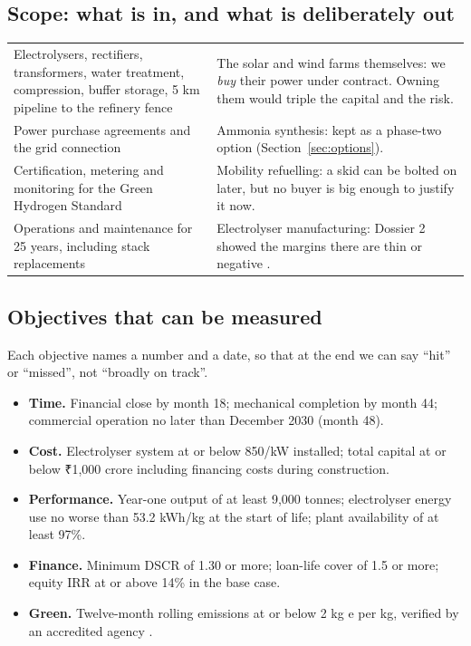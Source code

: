 \subsection{Scope: what is in, and what is deliberately out}
\begin{center}\tablefont
\begin{tabularx}{\textwidth}{@{}L L@{}}
\toprule
{} & \\ \midrule
Electrolysers, rectifiers, transformers, water treatment, compression, buffer storage, 5 km pipeline to the refinery fence & The solar and wind farms themselves: we \emph{buy} their power under contract. Owning them would triple the capital and the risk.\\
Power purchase agreements and the grid connection & Ammonia synthesis: kept as a phase-two option (Section~\ref{sec:options}).\\
Certification, metering and monitoring for the Green Hydrogen Standard & Mobility refuelling: a skid can be bolted on later, but no buyer is big enough to justify it now.\\
Operations and maintenance for 25 years, including stack replacements & Electrolyser manufacturing: Dossier 2 showed the margins there are thin or negative \cite{nucera2025,enapter2026}.\\
\bottomrule
\end{tabularx}
\end{center}

\subsection{Objectives that can be measured}
Each objective names a number and a date, so that at the end we can say ``hit'' or ``missed'', not ``broadly on track''.
\begin{itemize}
\item \textbf{Time.} Financial close by month 18; mechanical completion by month 44; commercial operation no later than December 2030 (month 48).
\item \textbf{Cost.} Electrolyser system at or below \usd{}850/kW installed; total capital at or below ₹1,000 crore including financing costs during construction.
\item \textbf{Performance.} Year-one output of at least 9,000 tonnes; electrolyser energy use no worse than 53.2 kWh/kg at the start of life; plant availability of at least 97\%.
\item \textbf{Finance.} Minimum DSCR of 1.30 or more; loan-life cover of 1.5 or more; equity IRR at or above 14\% in the base case.
\item \textbf{Green.} Twelve-month rolling emissions at or below 2 kg \coo{}e per kg, verified by an accredited agency \cite{drishti2023}.
\end{itemize}

